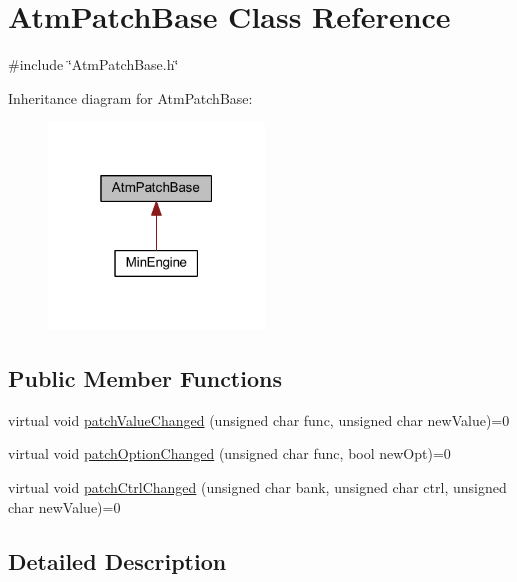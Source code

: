\hypertarget{class_atm_patch_base}{}\section{Atm\+Patch\+Base Class Reference}
\label{class_atm_patch_base}


{\ttfamily \#include \char`\"{}Atm\+Patch\+Base.\+h\char`\"{}}



Inheritance diagram for Atm\+Patch\+Base\+:
\nopagebreak
\begin{figure}[H]
\begin{center}
\leavevmode
\includegraphics[width=163pt]{class_atm_patch_base__inherit__graph}
\end{center}
\end{figure}
\subsection*{Public Member Functions}
\begin{DoxyCompactItemize}
\item 
virtual void \hyperlink{class_atm_patch_base_ad561145330e0b53990f222c243ef5e89}{patch\+Value\+Changed} (unsigned char func, unsigned char new\+Value)=0
\item 
virtual void \hyperlink{class_atm_patch_base_ad31f8d45a0a630ee3052d69ee125e2f3}{patch\+Option\+Changed} (unsigned char func, bool new\+Opt)=0
\item 
virtual void \hyperlink{class_atm_patch_base_a10abe1d35a241d61a83473ef8caaee33}{patch\+Ctrl\+Changed} (unsigned char bank, unsigned char ctrl, unsigned char new\+Value)=0
\end{DoxyCompactItemize}


\subsection{Detailed Description}


